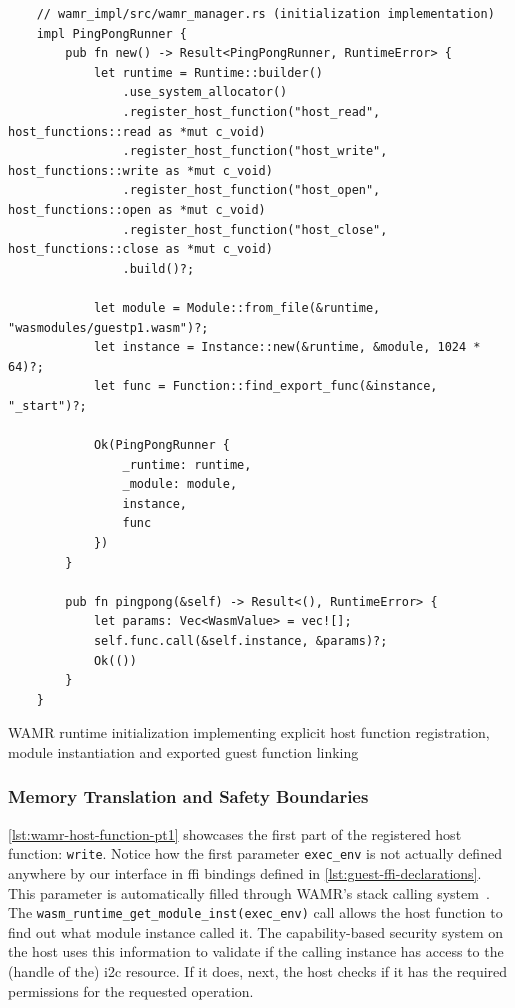 \begin{listing}[H]
    \begin{verbatim}
    // wamr_impl/src/wamr_manager.rs (initialization implementation)
    impl PingPongRunner {
        pub fn new() -> Result<PingPongRunner, RuntimeError> {
            let runtime = Runtime::builder()
                .use_system_allocator()
                .register_host_function("host_read", host_functions::read as *mut c_void)
                .register_host_function("host_write", host_functions::write as *mut c_void)
                .register_host_function("host_open", host_functions::open as *mut c_void)
                .register_host_function("host_close", host_functions::close as *mut c_void)
                .build()?;
    
            let module = Module::from_file(&runtime, "wasmodules/guestp1.wasm")?;
            let instance = Instance::new(&runtime, &module, 1024 * 64)?;
            let func = Function::find_export_func(&instance, "_start")?;
            
            Ok(PingPongRunner { 
                _runtime: runtime, 
                _module: module, 
                instance, 
                func 
            })
        }
    
        pub fn pingpong(&self) -> Result<(), RuntimeError> {
            let params: Vec<WasmValue> = vec![];
            self.func.call(&self.instance, &params)?;
            Ok(())
        }
    }
    \end{verbatim}
    \caption{WAMR runtime initialization implementing explicit host function registration, module instantiation and exported guest function linking}
    \label{lst:wamr-initialization}
\end{listing}

\subsubsection{Memory Translation and Safety Boundaries}

\autoref{lst:wamr-host-function-pt1} showcases the first part of the registered host function: \texttt{write}. Notice how the first parameter \texttt{exec\_env} is not actually defined anywhere by our interface in \acrshort{ffi} bindings defined in \autoref{lst:guest-ffi-declarations}. This parameter is automatically filled through WAMR's stack calling system~\cite{wamr_stacks}. The \sloppy\texttt{wasm\_runtime\_get\_module\_inst(exec\_env)} call allows the host function to find out what module instance called it. The capability-based security system on the host uses this information to validate if the calling instance has access to the (handle of the) \acrshort{i2c} resource. If it does, next, the host checks if it has the required permissions for the requested operation.


